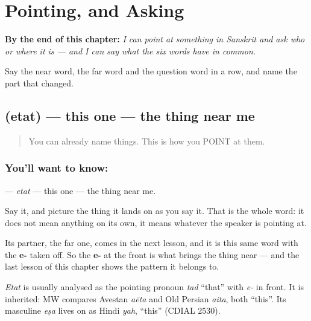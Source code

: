 
\chapter{Pointing, and Asking}
\label{ch:sa-pointing-and-asking}

\begin{chapteropening}
\textbf{By the end of this chapter:} \emph{I can point at something in Sanskrit and ask who or where it is — and I can say what the six words have in common.}

Say the near word, the far word and the question word in a row, and name the part that changed.
\end{chapteropening}

\section[\texorpdfstring{\sk{एतत्} (etat)}{एतत् (etat)}]{ (etat) — this one — the thing near me}

\label{lesson:SA-C14-this}



\begin{quote}
You can already name things. This is how you POINT at them.
\end{quote}

\subsection*{You'll want to know: }
\textbf{} — \emph{etat} — this one — the thing near me.

Say it, and picture the thing it lands on as you say it. That is the whole word: it does not mean anything on its own, it means whatever the speaker is pointing at.

Its partner, the far one, comes in the next lesson, and it is this same word with the \textbf{e-} taken off. So the \textbf{e-} at the front is what brings the thing near — and the last lesson of this chapter shows the pattern it belongs to.

\begin{cousinweb}
\emph{Etat} is usually analysed as the pointing pronoun \emph{tad} \textquotedblleft{}that\textquotedblright{} with \emph{e-} in front. It is inherited: MW compares Avestan \emph{aēta} and Old Persian \emph{aita}, both \textquotedblleft{}this\textquotedblright{}. Its masculine \emph{eṣa} lives on as Hindi \emph{yah}, \textquotedblleft{}this\textquotedblright{} (CDIAL 2530).
\end{cousinweb}


